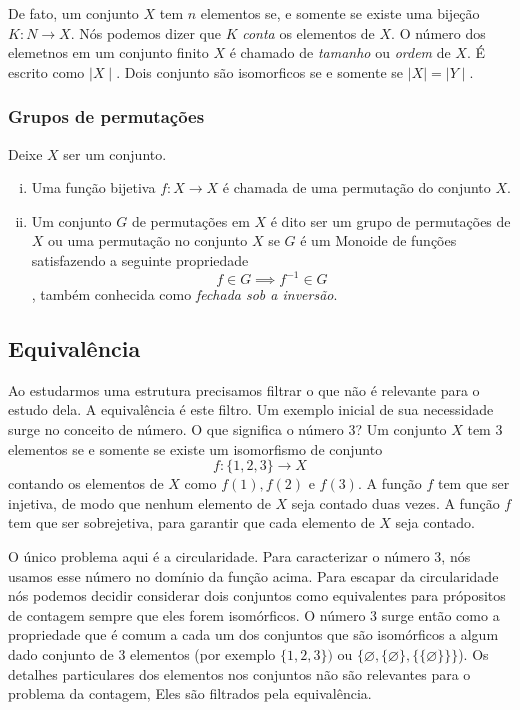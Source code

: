          De fato, um conjunto $X$ tem $n$ elementos se, e somente se existe uma bijeção $K: N\to X$. Nós podemos dizer que $K$ \emph{conta}  os elementos de $X$. O número dos elemetnos em um conjunto finito $X$ é chamado de \emph{tamanho} ou \emph{ordem} de $X$. É escrito como $\mid X\mid$. Dois conjunto são isomorficos se e somente se $\mid X\mid = \mid Y\mid$.

      \subsubsection{Grupos de permutações}
         \begin{definition}
            Deixe $X$ ser um conjunto.
            \begin{enumerate}[i.]
               \item Uma função bijetiva $f: X \to X$ é chamada de uma permutação do conjunto $X$.
               \item Um conjunto $G$ de permutações em $X$ é dito ser um grupo de permutações de $X$ ou uma permutação no conjunto $X$ se $G$ é um Monoide de funções satisfazendo a seguinte propriedade $$f \in G \implies f^{-1} \in G$$, também conhecida como \emph{fechada sob a inversão}.
            \end{enumerate}
         \end{definition}

   \subsection{Equivalência}
      Ao estudarmos uma estrutura precisamos filtrar o que não é relevante para o estudo dela. A equivalência é este filtro. Um exemplo inicial de sua necessidade surge no conceito de número. O que significa o número 3? Um conjunto $X$ tem 3 elementos se e somente se existe um isomorfismo de conjunto $$f: \{1,2,3\} \to X$$
      contando os elementos de $X$ como $f(1), f(2)$ e $f(3)$. A função $f$ tem que ser injetiva, de modo que nenhum elemento de $X$ seja contado duas vezes. A função $f$ tem que ser sobrejetiva, para garantir que cada elemento de $X$ seja contado.

      O único problema aqui é a circularidade. Para caracterizar o número 3, nós usamos esse número no domínio da função acima. Para escapar da circularidade nós podemos decidir considerar dois conjuntos como equivalentes para própositos de contagem sempre que eles forem isomórficos. O número 3 surge então como a propriedade que é comum a cada um dos conjuntos que são isomórficos a algum dado conjunto de 3 elementos (por exemplo $\{1,2,3\})$ ou $\{\varnothing , \{\varnothing\} , \{\{\varnothing\}\}\}$). Os detalhes particulares dos elementos nos conjuntos não são relevantes para o problema da contagem, Eles são filtrados pela equivalência.

